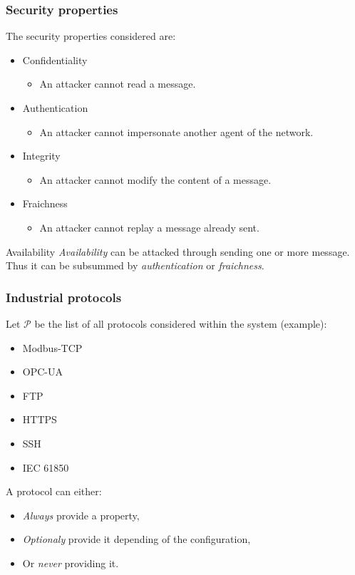 \documentclass{beamer}
\begin{document}
\begin{frame}
    \frametitle{Security properties}

    The security properties considered are:
    \vfill
    \begin{itemize}
        \item Confidentiality
        \begin{itemize}
            \item An attacker cannot read a message.
        \end{itemize}
        \vfill
        \item Authentication
        \begin{itemize}
            \item An attacker cannot impersonate another agent of the network.
        \end{itemize}
        \vfill
        \item Integrity
        \begin{itemize}
            \item An attacker cannot modify the content of a message.
        \end{itemize}
        \vfill
        \item Fraichness
        \begin{itemize}
            \item An attacker cannot replay a message already sent.
        \end{itemize}
    \end{itemize}
    \vfill
    \begin{block}{Availability}
        {\em Availability} can be attacked through sending one or more message.\\
        Thus it can be subsummed by {\em authentication} or {\em fraichness}.
    \end{block}
\end{frame}

\begin{frame}
    \frametitle{Industrial protocols}

    Let $\mathcal{P}$ be the list of all protocols considered within the system (example):
    \begin{itemize}
        \item Modbus-TCP
        \item OPC-UA
        \item FTP
        \item HTTPS
        \item SSH
        \item IEC 61850
    \end{itemize}
    \vfill
    \begin{block}{A protocol can either:}
        \begin{itemize}
            \item {\em Always} provide a property,
            \item {\em Optionaly} provide it depending of the configuration,
            \item Or {\em never} providing it.
        \end{itemize}
    \end{block}
\end{frame}
\end{document}
